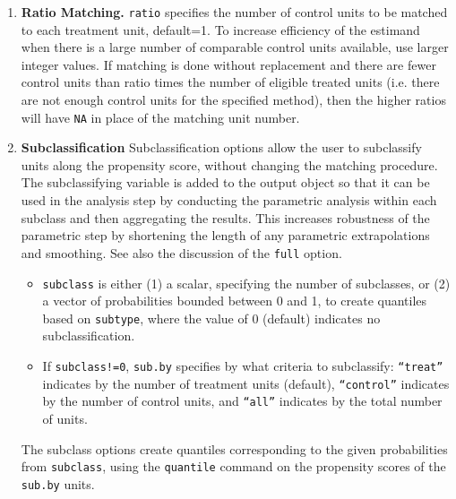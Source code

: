 \documentclass[oneside,letterpaper,titlepage]{article}
\begin{document}
\begin{enumerate}
\item \textbf{Ratio Matching.}  \texttt{ratio} specifies the number of
  control units to be matched to each treatment unit, default=1.  To
  increase efficiency of the estimand when there is a large number of
  comparable control units available, use larger integer values. If
  matching is done without replacement and there are fewer control
  units than ratio times the number of eligible treated units (i.e.
  there are not enough control units for the specified method), then
  the higher ratios will have \texttt{NA} in place of the matching
  unit number.
  
\item \textbf{Subclassification} Subclassification options allow the
  user to subclassify units along the propensity score, without
  changing the matching procedure.  The subclassifying variable is
  added to the output object so that it can be used in the analysis
  step by conducting the parametric analysis within each subclass and
  then aggregating the results.  This increases robustness of the
  parametric step by shortening the length of any parametric
  extrapolations and smoothing.  See also the discussion of the
  \texttt{full} option.
  \begin{itemize}
  \item \texttt{subclass} is either (1) a scalar, specifying the
    number of subclasses, or (2) a vector of probabilities bounded
    between 0 and 1, to create quantiles based on \texttt{subtype},
    where the value of 0 (default) indicates no subclassification.
  \item If \texttt{subclass!=0}, \texttt{sub.by} specifies by what
    criteria to subclassify: \texttt{``treat''} indicates by the
    number of treatment units (default), \texttt{``control''}
    indicates by the number of control units, and \texttt{``all''}
    indicates by the total number of units.
  \end{itemize}
  The subclass options create quantiles corresponding to the given
  probabilities from \texttt{subclass}, using the \texttt{quantile}
  command on the propensity scores of the \texttt{sub.by} units.
  

\end{enumerate}
\end{document}
